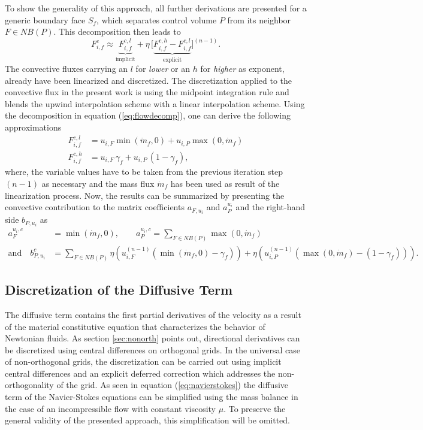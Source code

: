 To show the generality of this approach, all further derivations are presented for a generic boundary face \(S_f\), which separates control volume \(P\) from its neighbor \(F \in NB(P)\). This decomposition then leads to
\begin{equation}
  \label{eq:flowdecomp}
  F_{i,f}^c \approx  \underbrace{F_{i,f}^{c,l}}_{\text{implicit}} + \eta \, \bigl[\underbrace{ F_{i,f}^{c,h} - F_{i,f}^{c,l} }_{\text{explicit}}\bigr]^{(n-1)}.
\end{equation}
The convective fluxes carrying an \(l\) for \emph{lower} or an \(h\) for \emph{higher} as exponent, already have been linearized and discretized. The discretization applied to the convective flux in the present work is using the midpoint integration rule and blends the upwind interpolation scheme with a linear interpolation scheme. Using the decomposition in equation (\ref{eq:flowdecomp}), one can derive the following approximations
\begin{align*}
  F_{i,f}^{c,l} &= u_{i,F} \min(\dot{m}_f ,0) + u_{i,P} \max(0,\dot{m}_f) \\
  F_{i,f}^{c,h} &= u_{i,F} \, \gamma_f + u_{i,P} \, (1 - \gamma_f),
\end{align*}
where, the variable values have to be taken from the previous iteration step \((n-1)\) as necessary and the mass flux \(\dot{m}_f\) has been used as result of the linearization process. Now, the results can be summarized by presenting the convective contribution to the matrix coefficients \(a_{F,u_i}\) and \(a_P^{u_i}\) and the right-hand side \(b_{P,u_i}\) as
\begin{align*}
  a_F^{u_i,c} &= \min(\dot{m}_f ,0), \quad \quad a_P^{u_i,c} = \sum_{F \in NB(P)} \max(0,\dot{m}_f) \\[1em]
  \text{and} \quad b_{P,u_i}^c &= \sum_{F \in NB(P)} \eta  \left(u_{i,F}^{(n-1)} \left( \min(\dot{m}_f,0) - \gamma_f \right)\right)
                   + \eta \left( u_{i,P}^{(n-1)} \left( \max(0,\dot{m}_f) - \left(1 - \gamma_f\right) \right)\right).
\end{align*}

\subsection{Discretization of the Diffusive Term}

The diffusive term contains the first partial derivatives of the velocity as a result of the material constitutive equation that characterizes the behavior of Newtonian fluids. As section \ref{sec:nonorth} points out, directional derivatives can be discretized using central differences on orthogonal grids. In the universal case of non-orthogonal grids, the discretization can be carried out using implicit central differences and an explicit deferred correction which addresses the non-orthogonality of the grid. As seen in equation (\ref{eq:navierstokes}) the diffusive term of the Navier-Stokes equations can be simplified using the mass balance in the case of an incompressible flow with constant viscosity \(\mu\). To preserve the general validity of the presented approach, this simplification will be omitted.

